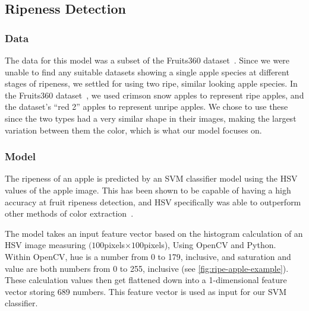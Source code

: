 \subsection{Ripeness Detection}\label{subsec:ripeness-detection}

\subsubsection{Data}
The data for this model was a subset of the Fruits360 dataset~\cite{Fruit360}.
Since we were unable to find any suitable datasets showing a single apple species at
different stages of ripeness, we settled for using two ripe, similar looking apple
species.
In the Fruits360 dataset~\cite{Fruit360}, we used crimson snow apples to represent
ripe apples, and the dataset's ``red 2'' apples to represent unripe apples.
We chose to use these since the two types had a very similar shape in their images,
making the largest variation between them the color, which is what our model focuses on.

\subsubsection{Model}
The ripeness of an apple is predicted by an SVM classifier model using the HSV values
of the apple image.
This has been shown to be capable of having a high accuracy at fruit ripeness
detection, and HSV specifically was able to outperform other methods of color
extraction~\cite{HSVRipeness}.

The model takes an input feature vector based on the histogram calculation of an HSV
image measuring $(100$pixels$\times100$pixels), Using OpenCV and Python.
Within OpenCV, hue is a number from 0 to 179, inclusive, and saturation and value are
both numbers from 0 to 255, inclusive (see \autoref{fig:ripe-apple-example}).
These calculation values then get flattened down into a 1-dimensional feature vector
storing 689 numbers.
This feature vector is used as input for our SVM classifier.

